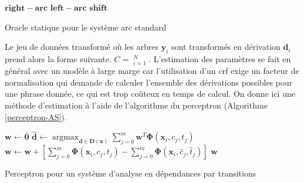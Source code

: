 \documentclass[11pt,openany]{book}
\begin{document}
\begin{algorithm}
\scriptsize
\begin{algorithmic}[0]
 
\State \Return $\mathbf{right-arc}$
\State \Return $\mathbf{left-arc}$
\EndIf
\EndIf
{} 
\State\Return $\mathbf{shift}$
\EndIf
\EndFunction
\end{algorithmic}
\caption{\label{algo-AS-oracle} Oracle statique pour le système arc
  standard}
\end{algorithm}
Le jeu de données transformé où les arbres $\mathbf{y}_i$ sont
transformés en dérivation $\mathbf{d}_i$ prend alors la forme suivante.
$C = \mathop{(\mathbf{x}_i,\mathbf{d}_i)}^N_{i=1}$. L'estimation des
paramètres se fait en général avec un modèle à large marge car
l'utilisation d'un {\sc crf} exige un facteur de
normalisation qui demande de calculer l'ensemble des dérivations
possibles pour une phrase donnée, ce qui est trop coûteux en temps de calcul.
On donne ici une méthode d'estimation à l'aide de l'algorithme du
perceptron (Algorithme \ref{perceptron-AS}).

\begin{algorithm}[htbp]
\begin{algorithmic}[1]
\State $\mathbf{w} \gets \bar{\mathbf{0}}$
\State
$\hat{\mathbf{d}} \gets \mathop{\text{argmax}}_{\mathbf{d}\in
  \mathbf{D}(\mathbf{x})} 
\sum_{j = 0}^m \mathbf{w}^T \boldsymbol\Phi(\mathbf{x}_i,c_j,t_j)$
     \State $\mathbf{w} \gets  \mathbf{w} +
     \left[ \sum_{j=0}^m \boldsymbol\Phi(\mathbf{x}_i,c_j,t_j) 
       - \sum_{j=0}^m \boldsymbol\Phi(\mathbf{x}_i,\hat{c}_j,\hat{t}_j)   \right]$ 
\EndIf
\EndFor
\EndFor
\State \Return $\mathbf{w}$
\EndFunction
\end{algorithmic}
\caption{\label{perceptron-AS}Perceptron pour un système d'analyse
  en dépendances par transitions}
\end{algorithm}
\end{document}

